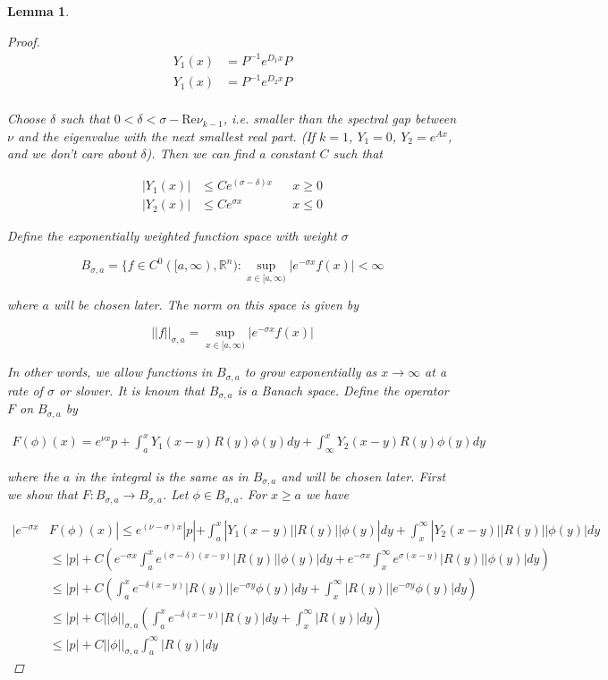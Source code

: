\documentclass[12pt]{article}
\def\R{{\mathbb R}}
\newtheorem{lemma}{Lemma}
\begin{document}
\begin{lemma}
\begin{proof}
\begin{align*}
Y_1(x) &= P^{-1}e^{D_1x}P \\
Y_1(x) &= P^{-1}e^{D_2x}P \\
\end{align*}
 
Choose $\delta$ such that $0 < \delta < \sigma - \text{Re} \nu_{k-1}$, i.e. smaller than the spectral gap between $\nu$ and the eigenvalue with the next smallest real part. (If $k = 1$, $Y_1 = 0$, $Y_2 = e^{Ax}$, and we don't care about $\delta$). Then we can find a constant $C$ such that

\begin{align*} 
|Y_1(x)| &\leq Ce^{(\sigma - \delta)x} && x \geq 0 \\
|Y_2(x)| &\leq Ce^{\sigma x} && x \leq 0 
\end{align*}

Define the exponentially weighted function space with weight $\sigma$

\[
B_{\sigma, a} = \{ f \in C^0([a, \infty), \R^n) : \sup_{x \in [a, \infty)} |e^{-\sigma x} f(x)| < \infty 
\]

where $a$ will be chosen later. The norm on this space is given by

\[
||f||_{\sigma, a} = \sup_{x \in [a, \infty)} |e^{-\sigma x} f(x)|
\]

In other words, we allow functions in $B_{\sigma, a}$ to grow exponentially as $x \rightarrow \infty$ at a rate of $\sigma$ or slower. It is known that $B_{\sigma, a}$ is a Banach space. Define the operator $F$ on $B_{\sigma, a}$ by

\begin{align*}
F(\phi)(x) = e^{\nu x} p + \int_a^x Y_1(x - y)R(y)\phi(y)dy + \int_\infty^x Y_2(x - y)R(y)\phi(y)dy
\end{align*}

where the $a$ in the integral is the same as in $B_{\sigma, a}$ and will be chosen later. First we show that $F: B_{\sigma, a} \rightarrow B_{\sigma, a}$. Let $\phi \in B_{\sigma, a}$. For $x \geq a$ we have

\begin{align*}
|e^{-\sigma x} &F(\phi)(x)| \leq e^{(\nu - \sigma) x} |p| + \int_a^x |Y_1(x - y)||R(y)||\phi(y)| dy + \int_x^\infty |Y_2(x - y)||R(y)||\phi(y)|dy \\
&\leq |p| + C \left( e^{-\sigma x}  \int_a^x e^{(\sigma - \delta)(x - y)}|R(y)||\phi(y)| dy + e^{-\sigma x}  \int_x^\infty e^{\sigma(x - y)}|R(y)||\phi(y)|dy \right) \\
&\leq |p| +  C \left( \int_a^x e^{-\delta(x - y)}|R(y)||e^{-\sigma y}\phi(y)| dy + \int_x^\infty |R(y)||e^{-\sigma y} \phi(y)|dy \right) \\
&\leq |p| + C ||\phi||_{\sigma, a}\left( \int_a^x e^{-\delta(x - y)}|R(y)| dy + \int_x^\infty |R(y)|dy \right) \\
&\leq |p| + C ||\phi||_{\sigma, a} \int_a^\infty |R(y)| dy 
\end{align*}


\end{proof}
\end{lemma}
\end{document}
